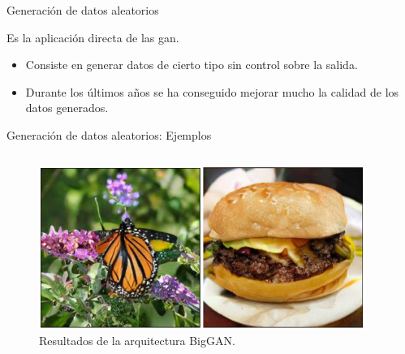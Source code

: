 \begin{frame}{Generación de datos aleatorios}

    Es la aplicación \alert{directa} de las \gls{gan}.
    
    \begin{itemize}
        \item Consiste en generar datos de cierto tipo \alert{sin control} sobre la salida.
        \item Durante los últimos años se ha conseguido \alert{mejorar mucho la calidad} de los datos generados.
    \end{itemize}

\end{frame}

\begin{frame}{Generación de datos aleatorios: Ejemplos}

    \begin{columns}[T]
    \begin{column}{.48\textwidth}
    
    \begin{figure}
        \centering
        \includegraphics[width=\textwidth]{Slides/figures/GAN/BigGAN.PNG}
        \caption{Resultados de la arquitectura BigGAN\cite{brock2018large}.}
    \end{figure}
    
    \end{column}
    \hfill
    \begin{column}{.48\textwidth}
    

\end{column}
\end{columns}
\end{frame}
